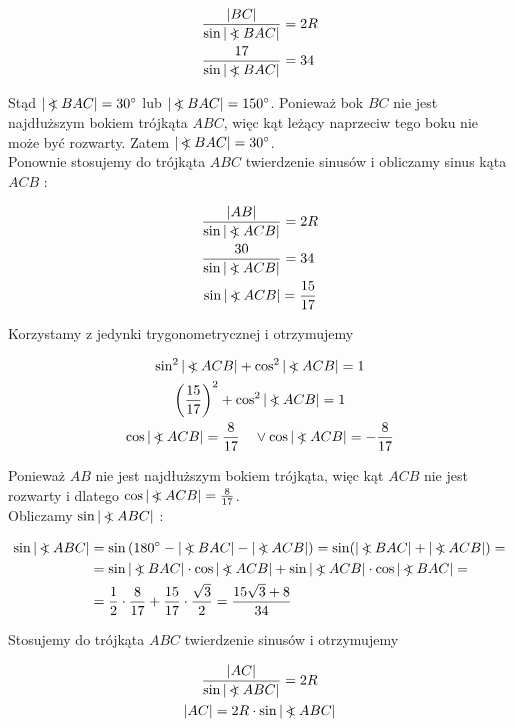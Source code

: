 \documentclass[10pt]{article}
\newcommand\Varangle{\mathop{{<\!\!\!\!\!\text{\small)}}\:}\nolimits}
\begin{document}
$$
\begin{aligned}
& \frac{|B C|}{\sin |\Varangle B A C|}=2 R \\
& \frac{17}{\sin |\Varangle B A C|}=34
\end{aligned}
$$

Stąd $|\Varangle B A C|=30^{\circ}$ lub $|\Varangle B A C|=150^{\circ}$. Ponieważ bok $B C$ nie jest najdłuższym bokiem trójkąta $A B C$, więc kąt leżący naprzeciw tego boku nie może być rozwarty. Zatem $|\Varangle B A C|=30^{\circ}$.\\
Ponownie stosujemy do trójkąta $A B C$ twierdzenie sinusów i obliczamy sinus kąta $A C B$ :

$$
\begin{aligned}
& \frac{|A B|}{\sin |\Varangle A C B|}=2 R \\
& \frac{30}{\sin |\Varangle A C B|}=34 \\
& \sin |\Varangle A C B|=\frac{15}{17}
\end{aligned}
$$

Korzystamy z jedynki trygonometrycznej i otrzymujemy

$$
\begin{gathered}
\sin ^{2}|\Varangle A C B|+\cos ^{2}|\Varangle A C B|=1 \\
\left(\frac{15}{17}\right)^{2}+\cos ^{2}|\Varangle A C B|=1 \\
\cos |\Varangle A C B|=\frac{8}{17} \quad \vee \cos |\Varangle A C B|=-\frac{8}{17}
\end{gathered}
$$

Ponieważ $A B$ nie jest najdłuższym bokiem trójkąta, więc kąt $A C B$ nie jest rozwarty i dlatego $\cos |\Varangle A C B|=\frac{8}{17}$.\\
Obliczamy $\sin |\Varangle A B C|$ :

$$
\begin{aligned}
\sin |\Varangle A B C| & =\sin \left(180^{\circ}-|\Varangle B A C|-|\Varangle A C B|\right)=\sin (|\Varangle B A C|+|\Varangle A C B|)= \\
& =\sin |\Varangle B A C| \cdot \cos |\Varangle A C B|+\sin |\Varangle A C B| \cdot \cos |\Varangle B A C|= \\
& =\frac{1}{2} \cdot \frac{8}{17}+\frac{15}{17} \cdot \frac{\sqrt{3}}{2}=\frac{15 \sqrt{3}+8}{34}
\end{aligned}
$$

Stosujemy do trójkąta $A B C$ twierdzenie sinusów i otrzymujemy

$$
\begin{gathered}
\frac{|A C|}{\sin |\Varangle A B C|}=2 R \\
|A C|=2 R \cdot \sin |\Varangle A B C|
\end{gathered}
$$
\end{document}
